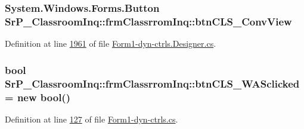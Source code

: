 \hypertarget{class_sr_p___classroom_inq_1_1frm_classrrom_inq_a2e74908e00f7502b511e8726d1574d7e}{
\subsubsection[{btn\-C\-L\-S\-\_\-\-Conv\-View}]{\setlength{\rightskip}{0pt plus 5cm}\-System.\-Windows.\-Forms.\-Button {\bf \-Sr\-P\-\_\-\-Classroom\-Inq\-::frm\-Classrrom\-Inq\-::btn\-C\-L\-S\-\_\-\-Conv\-View}}}
\label{class_sr_p___classroom_inq_1_1frm_classrrom_inq_a2e74908e00f7502b511e8726d1574d7e}


\-Definition at line \hyperlink{_form1-dyn-ctrls_8_designer_8cs_source_l01961}{1961} of file \hyperlink{_form1-dyn-ctrls_8_designer_8cs_source}{\-Form1-\/dyn-\/ctrls.\-Designer.\-cs}.

\hypertarget{class_sr_p___classroom_inq_1_1frm_classrrom_inq_aed9d1ad7c4e2b196997c1820ac2cdb4d}{
\subsubsection[{btn\-C\-L\-S\-\_\-\-W\-A\-Sclicked}]{\setlength{\rightskip}{0pt plus 5cm}bool {\bf \-Sr\-P\-\_\-\-Classroom\-Inq\-::frm\-Classrrom\-Inq\-::btn\-C\-L\-S\-\_\-\-W\-A\-Sclicked} = new bool()}}
\label{class_sr_p___classroom_inq_1_1frm_classrrom_inq_aed9d1ad7c4e2b196997c1820ac2cdb4d}


\-Definition at line \hyperlink{_form1-dyn-ctrls_8cs_source_l00127}{127} of file \hyperlink{_form1-dyn-ctrls_8cs_source}{\-Form1-\/dyn-\/ctrls.\-cs}.

